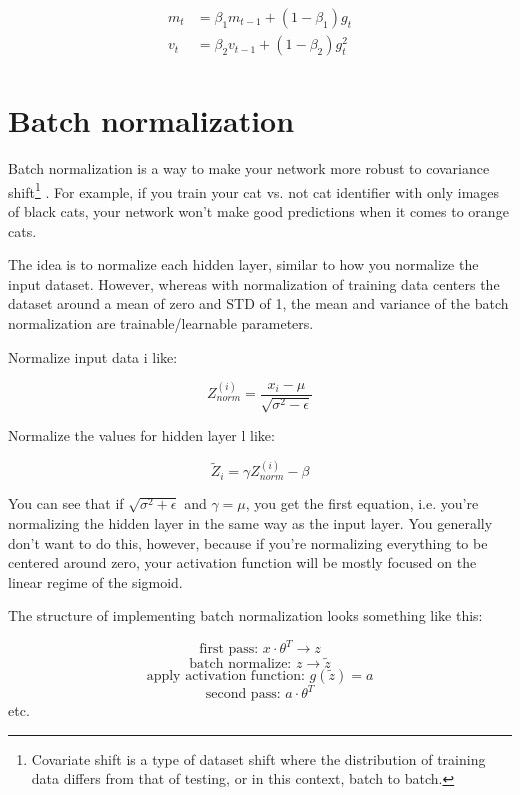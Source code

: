 \begin{align} 
    \begin{split} 
    m_t &= \beta_1 m_{t-1} + (1 - \beta_1) g_t \\ 
    v_t &= \beta_2 v_{t-1} + (1 - \beta_2) g_t^2 
    \end{split} 
\end{align}


\section{Batch normalization}

Batch normalization is a way to make your network more robust to covariance shift\footnote{Covariate shift is a type of dataset shift where the distribution of training data differs from that of testing, or in this context, batch to batch.} \cite{batch-norm-orig}  \cite{batch-norm-conference}. For example, if you train your cat vs. not cat identifier with only images of black cats, your network won't make good predictions when it comes to orange cats.

The idea is to normalize each hidden layer, similar to how you normalize the input dataset. However, whereas with normalization of training data centers the dataset around a mean of zero and STD of 1, the mean and variance of the batch normalization are trainable/learnable parameters.

Normalize input data i like:


\begin{equation}
    Z_{norm}^{(i)} = \frac{x_i-\mu}{\sqrt{\sigma^2-\epsilon}}
\end{equation}


Normalize the values for hidden layer l like:

\begin{equation}
\widetilde{Z}_i = \gamma Z_{norm}^{(i)} - \beta
\end{equation}

You can see that if $\sqrt{\sigma^2 + \epsilon}$ and $\gamma = \mu$, you get the first equation, i.e. you're normalizing the hidden layer in the same way as the input layer. You generally don't want to do this, however, because if you're normalizing everything to be centered around zero, your activation function will be mostly focused on the linear regime of the sigmoid.

The structure of implementing batch normalization looks something like this:

$$\text{first pass: } x \cdot \theta^T \rightarrow z$$
$$\text{batch normalize: } z \rightarrow \widetilde{z}$$ 
$$\text{apply activation function: } g(\widetilde{z}) = a$$
$$\text{second pass: } a \cdot \theta^T$$     
etc.

